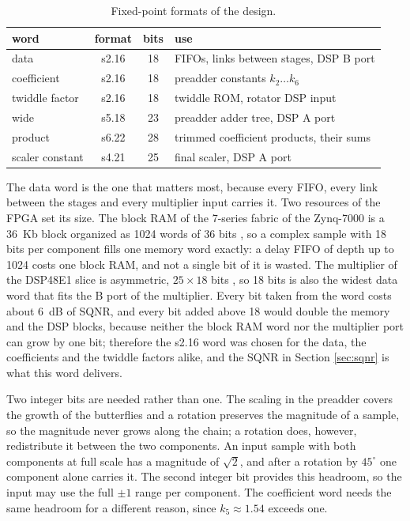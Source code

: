 \documentclass[a4paper,12pt, master]{etf}
\begin{document}
\begin{table}[H]
\centering
\caption{Fixed-point formats of the design.}
\medskip
\label{tab:fxp_formats}
\begin{tabular}{l c c l}
\hline
word & format & bits & use \\
\hline
\hline
data & s2.16 & 18 & FIFOs, links between stages, DSP B port \\
coefficient & s2.16 & 18 & preadder constants $k_2 \ldots k_6$ \\
twiddle factor & s2.16 & 18 & twiddle ROM, rotator DSP input \\
wide & s5.18 & 23 & preadder adder tree, DSP A port \\
product & s6.22 & 28 & trimmed coefficient products, their sums \\
scaler constant & s4.21 & 25 & final scaler, DSP A port \\
\hline
\end{tabular}
\end{table}

The data word is the one that matters most, because every FIFO, every link between the stages and every multiplier input carries it. Two resources of the FPGA set its size. The block RAM of the 7-series fabric of the Zynq-7000 is a 36~Kb block organized as 1024 words of 36 bits \cite{ug473}, so a complex sample with 18 bits per component fills one memory word exactly: a delay FIFO of depth up to 1024 costs one block RAM, and not a single bit of it is wasted. The multiplier of the DSP48E1 slice is asymmetric, $25 \times 18$ bits \cite{ug479}, so 18 bits is also the widest data word that fits the B port of the multiplier. Every bit taken from the word costs about $6$~dB of SQNR, and every bit added above 18 would double the memory and the DSP blocks, because neither the block RAM word nor the multiplier port can grow by one bit; therefore the s2.16 word was chosen for the data, the coefficients and the twiddle factors alike, and the SQNR in Section \ref{sec:sqnr} is what this word delivers.

Two integer bits are needed rather than one. The scaling in the preadder covers the growth of the butterflies and a rotation preserves the magnitude of a sample, so the magnitude never grows along the chain; a rotation does, however, redistribute it between the two components. An input sample with both components at full scale has a magnitude of $\sqrt{2}$, and after a rotation by $45^\circ$ one component alone carries it. The second integer bit provides this headroom, so the input may use the full $\pm 1$ range per component. The coefficient word needs the same headroom for a different reason, since $k_5 \approx 1.54$ exceeds one.
\end{document}
